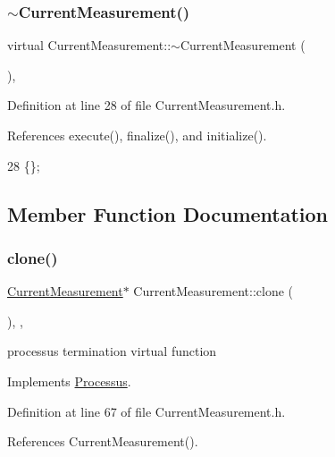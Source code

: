 \subsubsection{\texorpdfstring{$\sim$\+Current\+Measurement()}{~CurrentMeasurement()}}
{\footnotesize\ttfamily virtual Current\+Measurement\+::$\sim$\+Current\+Measurement (\begin{DoxyParamCaption}{ }\end{DoxyParamCaption})\hspace{0.3cm}{\ttfamily [inline]}, {\ttfamily [virtual]}}



Definition at line 28 of file Current\+Measurement.\+h.



References execute(), finalize(), and initialize().


\begin{DoxyCode}
28 \{\}; 
\end{DoxyCode}


\subsection{Member Function Documentation}
\mbox{\label{classCurrentMeasurement_a7722435fcc404fe4761c3fa96f3b6338}} 
\subsubsection{\texorpdfstring{clone()}{clone()}}
{\footnotesize\ttfamily \hyperlink{classCurrentMeasurement_1_1CurrentMeasurement}{Current\+Measurement}$\ast$ Current\+Measurement\+::clone (\begin{DoxyParamCaption}{ }\end{DoxyParamCaption})\hspace{0.3cm}{\ttfamily [inline]}, {\ttfamily [protected]}, {\ttfamily [virtual]}}

processus termination virtual function 

Implements \hyperlink{classProcessus_aca8856f6d6d7b7e1fe941f298dcbb502}{Processus}.



Definition at line 67 of file Current\+Measurement.\+h.



References Current\+Measurement().


